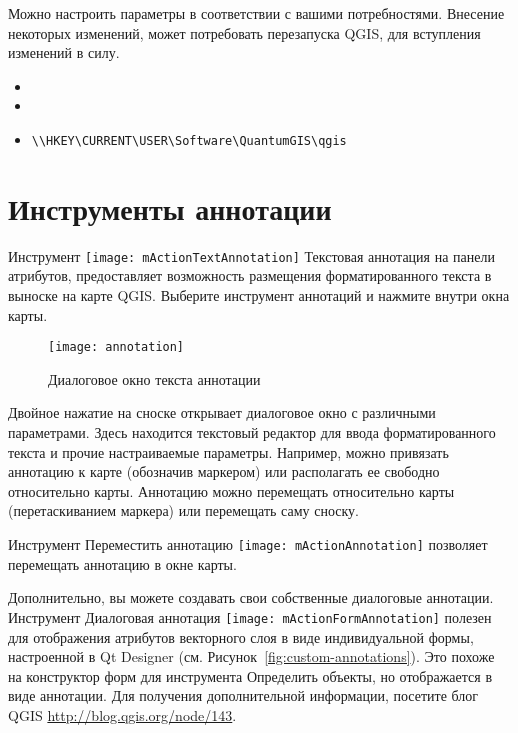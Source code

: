 Можно настроить параметры в соответствии с вашими потребностями. Внесение
некоторых изменений, может потребовать перезапуска QGIS, для вступления
изменений в силу.

\begin{itemize}
\item {}
\item {}
\item {}
\begin{verbatim}
\\HKEY\CURRENT\USER\Software\QuantumGIS\qgis
\end{verbatim}
\end{itemize}

\section{Инструменты аннотации}\label{sec:annotations}

Инструмент \texttt{[image: mActionTextAnnotation]}
Текстовая аннотация на панели атрибутов, предоставляет возможность размещения
форматированного текста в выноске на карте QGIS. Выберите инструмент аннотаций
и нажмите внутри окна карты.

\begin{figure}[ht]
   \centering
   \texttt{[image: annotation]}
   \caption{Диалоговое окно текста аннотации \nixcaption}
   \label{fig:annotation}
\end{figure}

Двойное нажатие на сноске открывает диалоговое окно с различными параметрами.
Здесь находится текстовый редактор для ввода форматированного текста и прочие
настраиваемые параметры. Например, можно привязать аннотацию к карте
(обозначив маркером) или располагать ее свободно относительно карты. Аннотацию
можно перемещать относительно карты (перетаскиванием маркера) или перемещать
саму сноску.

Инструмент Переместить аннотацию
\texttt{[image: mActionAnnotation]} позволяет
перемещать аннотацию в окне карты.


Дополнительно, вы можете создавать свои собственные диалоговые аннотации.
Инструмент Диалоговая аннотация
\texttt{[image: mActionFormAnnotation]} полезен
для отображения атрибутов векторного слоя в виде индивидуальной формы,
настроенной в Qt Designer (см. Рисунок~\ref{fig:custom-annotations}).
Это похоже на конструктор форм для инструмента Определить объекты, но
отображается в виде аннотации. Для получения дополнительной информации,
посетите блог QGIS \url{http://blog.qgis.org/node/143}.

